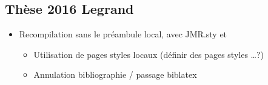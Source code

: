 \subsection{Thèse 2016 Legrand}

\begin{itemize}
\item Recompilation sans le préambule local, avec JMR.sty et \UGE
  \begin{itemize}
  \item Utilisation de pages styles locaux (définir des pages styles \UGE\ldots{}?)
  \item Annulation bibliographie / passage biblatex
  \end{itemize}
\end{itemize}